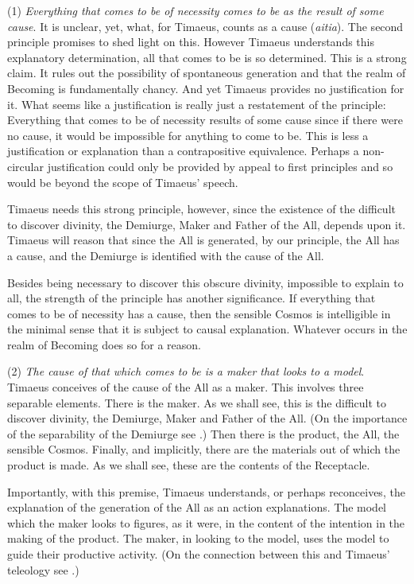 (1) \emph{Everything that comes to be of necessity comes to be as the result of some cause}. It is unclear, yet, what, for Timaeus, counts as a cause (\emph{aitia}). The second principle promises to shed light on this. However Timaeus understands this explanatory determination, all that comes to be is so determined. This is a strong claim. It rules out the possibility of spontaneous generation and that the realm of Becoming is fundamentally chancy. And yet Timaeus provides no justification for it. What seems like a justification is really just a restatement of the principle: Everything that comes to be of necessity results of some cause since if there were no cause, it would be impossible for anything to come to be. This is less a justification or explanation than a contrapositive equivalence. Perhaps a non-circular justification could only be provided by appeal to first principles and so would be beyond the scope of Timaeus' speech.

Timaeus needs this strong principle, however, since the existence of the difficult to discover divinity, the Demiurge, Maker and Father of the All, depends upon it. Timaeus will reason that since the All is generated, by our principle, the All has a cause, and the Demiurge is identified with the cause of the All. 

Besides being necessary to discover this obscure divinity, impossible to explain to all, the strength of the principle has another significance. If everything that comes to be of necessity has a cause, then the sensible Cosmos is intelligible in the minimal sense that it is subject to causal explanation. Whatever occurs in the realm of Becoming does so for a reason.

(2) \emph{The cause of that which comes to be is a maker that looks to a model}. Timaeus conceives of the cause of the All as a maker. This involves three separable elements. There is the maker. As we shall see, this is the difficult to discover divinity, the Demiurge, Maker and Father of the All. (On the importance of the separability of the Demiurge see \citealt[chapter 1]{Broadie:2012vl}.) Then there is the product, the All, the sensible Cosmos. Finally, and implicitly, there are the materials out of which the product is made. As we shall see, these are the contents of the Receptacle. 

Importantly, with this premise, Timaeus understands, or perhaps reconceives, the explanation of the generation of the All as an action explanations. The model which the maker looks to figures, as it were, in the content of the intention in the making of the product. The maker, in looking to the model, uses the model to guide their productive activity. (On the connection between this and Timaeus' teleology see \citealt{Johansen:2004dx}.)

